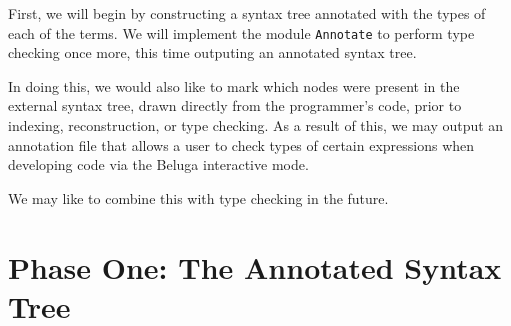\documentclass[11pt]{article} %
\begin{document}
First, we will begin by constructing a syntax tree annotated with the types of each of the terms. We will implement the module \verb+Annotate+ to perform type checking once more, this time outputing an annotated syntax tree.

In doing this, we would also like to mark which nodes were present in the external syntax tree, drawn directly from the programmer's code, prior to indexing, reconstruction, or type checking. As a result of this, we may output an annotation file that allows a user to check types of certain expressions when developing code via the Beluga interactive mode.

We may like to combine this with type checking in the future.

\section{Phase One: The Annotated Syntax Tree}
\end{document}
